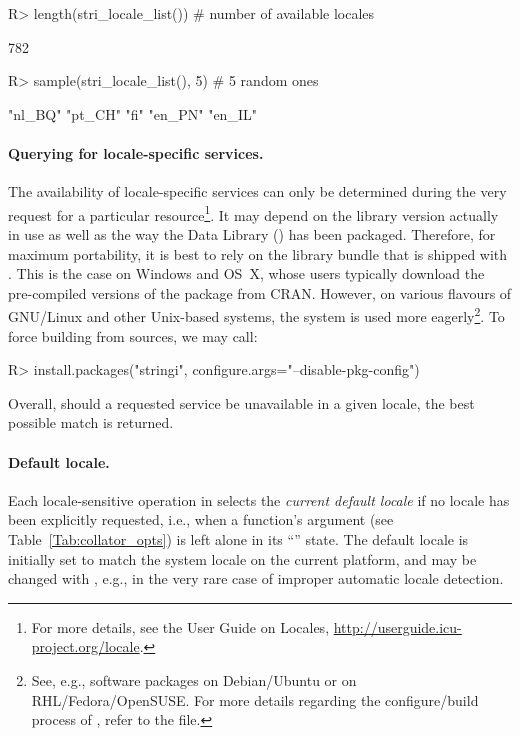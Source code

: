 \documentclass[nojss]{jss}\usepackage[]{graphicx}\usepackage[]{color}
\begin{document}
\begin{Schunk}
\begin{Sinput}
R> length(stri_locale_list())     # number of available locales
\end{Sinput}
\begin{Soutput}
[1] 782
\end{Soutput}
\begin{Sinput}
R> sample(stri_locale_list(), 5)  # 5 random ones
\end{Sinput}
\begin{Soutput}
[1] "nl_BQ" "pt_CH" "fi"    "en_PN" "en_IL"
\end{Soutput}
\end{Schunk}



\paragraph{Querying for locale-specific services.}
The availability of locale-specific services can only be determined during
the very request for a particular resource\footnote{For more details,
see the  User Guide on {Locales}, \url{http://userguide.icu-project.org/locale}.}.
It may depend on the  library version
actually in use as well as the way the  Data Library ()
has been packaged. Therefore, for maximum portability,
it is best to rely on the  library bundle that
is shipped with .
This is the case on Windows and OS~X, whose users typically download the
pre-compiled versions of the package from CRAN.
However, on various flavours of GNU/Linux and other Unix-based systems,
the system  is used more eagerly\footnote{
See, e.g., software packages
 on Debian/Ubuntu or  on RHL/Fedora/OpenSUSE.
For more details regarding the configure/build process of ,
refer to the  file.}.
To force building  from sources, we may call:

\begin{Schunk}
\begin{Sinput}
R> install.packages("stringi", configure.args="--disable-pkg-config")
\end{Sinput}
\end{Schunk}

Overall, should a requested service be unavailable
in a given locale, the best possible match is returned.


\paragraph{Default locale.}
Each locale-sensitive operation in  selects the \textit{current
default locale} if no locale has been explicitly requested,
i.e., when a function's  argument (see Table~\ref{Tab:collator_opts})
is left alone in its ``'' state.
The default locale is initially set to match the system locale on the current
platform, and may be changed with , e.g.,
in the very rare case of improper automatic locale detection.
\end{document}
